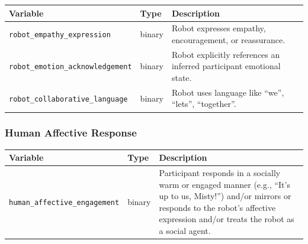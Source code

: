 \documentclass[
  authoryear,
  doubleblind,
  3p]{elsarticle}
\newcounter{none} %
\begin{document}
{\def\LTcaptype{none} %
\begin{longtable}[]{@{}
  >{\raggedright\arraybackslash}p{}
  >{\raggedright\arraybackslash}p{}
  >{\raggedright\arraybackslash}p{}@{}}
\toprule\noalign{}
\begin{minipage}[b]{\linewidth}\raggedright
Variable
\end{minipage} & \begin{minipage}[b]{\linewidth}\raggedright
Type
\end{minipage} & \begin{minipage}[b]{\linewidth}\raggedright
Description
\end{minipage} \\
\midrule\noalign{}
\endhead
\bottomrule\noalign{}
\endlastfoot
\texttt{robot\_empathy\_expression} & binary & Robot expresses empathy,
encouragement, or reassurance. \\
\texttt{robot\_emotion\_acknowledgement} & binary & Robot explicitly
references an inferred participant emotional state. \\
\texttt{robot\_collaborative\_language} & binary & Robot uses language
like ``we'', ``lets'', ``together''. \\
\end{longtable}
}

\subsubsection*{Human Affective
Response}\label{human-affective-response}

{\def\LTcaptype{none} %
\begin{longtable}[]{@{}
  >{\raggedright\arraybackslash}p{}
  >{\raggedright\arraybackslash}p{}
  >{\raggedright\arraybackslash}p{}@{}}
\toprule\noalign{}
\begin{minipage}[b]{\linewidth}\raggedright
Variable
\end{minipage} & \begin{minipage}[b]{\linewidth}\raggedright
Type
\end{minipage} & \begin{minipage}[b]{\linewidth}\raggedright
Description
\end{minipage} \\
\midrule\noalign{}
\endhead
\bottomrule\noalign{}
\endlastfoot
\texttt{human\_affective\_engagement} & binary & Participant responds in
a socially warm or engaged manner (e.g., ``It's up to us, Misty!'')
and/or mirrors or responds to the robot's affective expression and/or
treats the robot as a social agent. \\
\end{longtable}
}



\end{document}
